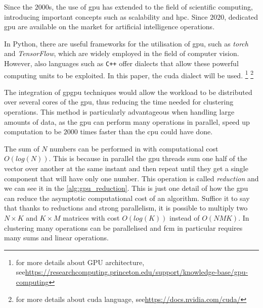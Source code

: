 \noindent Since the $2000$s, the use of \gls{gpu} has extended to the field of scientific computing, introducing important concepts such as scalability and \gls{hpc}. Since $2020$, dedicated \gls{gpu} are available on the market for artificial intelligence operations.

\noindent In \gls{Python}, there are useful frameworks for the utilisation of \gls{gpu}, such as \textit{torch} and \textit{TensorFlow}, which are widely employed in the field of computer vision. However, also languages such as \verb "C++" offer dialects that allow these powerful computing units to be exploited. In this paper, the \gls{cuda} dialect will be used.
\footnote{for more details about GPU architecture, see\newline\url{https://researchcomputing.princeton.edu/support/knowledge-base/gpu-computing}}
\footnote{for more details about \gls{cuda} language, see\newline\url{https://docs.nvidia.com/cuda/}}

\bigskip
The integration of \gls{gpgpu} techniques would allow the workload to be distributed over several cores of the \gls{gpu}, thus reducing the time needed for clustering operations. This method is particularly advantageous when handling large amounts of data, as the \gls{gpu} can perform many operations in parallel, speed up computation to be $2000$ times faster than the \gls{cpu} could have done.

\noindent The sum of $N$ numbers can be performed in with computational cost $O(log(N))$. This is because in parallel the \gls{gpu} threads sum one half of the vector over another at the same instant and then repeat until they get a single component that will have only one number. This operation is called \textit{reduction} and we can see it in the \cref{alg:gpu_reduction}. This is just one detail of how the \gls{gpu} can reduce the asymptotic computational cost of an algorithm. Suffice it to say that thanks to reductions and strong parallelism, it is possible to multiply two $N\times K$ and $K\times M$ matrices with cost $O(log(K))$ instead of $O(NMK)$. In clustering many operations can be parallelised and \gls{fcm} in particular requires many sums and linear operations.

